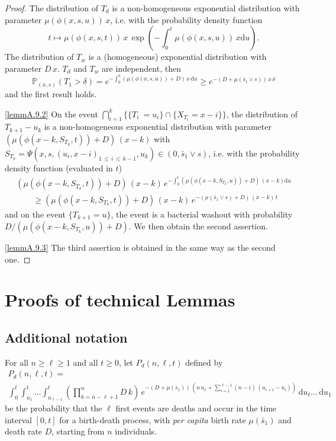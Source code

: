 \documentclass[AHL,Unicode,longabstracts,published]{cedram}
\newcommand{\PP}{\mathbb{P}}
\newcommand{\dif}{\mathrm{d}}
\newcommand{\barmu}{\mu(\bar s_1)}
\newcommand{\1}{\mathbf{1}}
\begin{document}
\begin{proof}
The distribution of $T_{d}$ is a non-homogeneous exponential distribution with parameter $\mu(\phi(x,s,u))\,x$, i.e. with the probability density function
\[
t\mapsto \mu(\phi(x,s,t))\,x\,\exp\left({-\int_0^t \mu(\phi(x,s,u))\,x \dif u}\right).
\]
The distribution of $T_{w}$ is a (homogeneous) exponential distribution with parameter $D\,x$. $T_{d}$ and $T_{w}$ are independent, then
\[
\PP_{(x,s)}(T_1 > \delta) = e^{-\int_0^\delta (\mu(\phi(x,s,u))+D)\,x \, \dif u}
\geq e^{-(D+\mu(\bar s_1 \vee s))\,x\,\delta}
\]
and the first result holds.


\eqref{lemmA.9.2} On the event $\bigcap_{i=1}^{k}\{\{T_i\ =u_i\} \cap \{ X_{T_i} = x-i \}\}$, the distribution of $T_{k+1}-u_k$ is a non-homogeneous exponential distribution with parameter $(\mu(\phi(x-k,S_{T_k},t))+D)\,(x-k)$ with $S_{T_k} = \Psi(x,s,(u_i,x-i)_{1\,\leq\,i \,\leq\,k-1}, u_k) \in (0,\bar s_1 \vee s)$, i.e. with the probability density function (evaluated in $t$)
\begin{multline*}
(\mu(\phi(x-k,S_{T_k},t))+D)\,(x-k)\,e^{-\int_0^t \left(\mu\left(\phi(x-k,S_{T_k},u)\right)+D\right)\,(x-k) \dif u}
\\ \qquad \geq (\mu(\phi(x-k,S_{T_k},t))+D)\,(x-k)\,e^{-(\mu(\bar s_1 \vee s)+D)\,(x-k)\,t}
\end{multline*}
and on the event $\{T_{k+1}=u\}$, the event is a bacterial washout with probability $D/(\mu(\phi(x-k,S_{T_k},u))+D)$. We then obtain the second assertion.

\eqref{lemmA.9.3} The third assertion is obtained in the same way as the second one.
\end{proof}



\section{Proofs of technical Lemmas}\label{sec.proofs.lemmas}



\subsection{Additional notation}\label{sec.add.notation.app}

For all $n\geq \ell\geq 1$ and all $t\geq0$, let $P_d(n,\ell,t)$ defined by
\begin{multline*}
P_d(n,\ell,t) = \\
\int_0^{t} \int_{u_1}^{t}\dots \int_{u_{\ell-1}}^{t}
\left(\prod_{k=n-\ell+1}^{n}D\,k\right)\, e^{-(D+\barmu)\,\left(n\,u_1+
\sum\limits_{i=1}^{\ell-1}(n-i)\,(u_{i+1}-u_{i})\right)}\,
\dif u_\ell \dots\,\dif u_1
\end{multline*}
be the probability that the $\ell$ first events are deaths and occur in the time interval $[0,t]$ for a birth-death process, with \emph{per capita} birth rate $\barmu$ and death rate $D$, starting from $n$ individuals.
\end{document}
